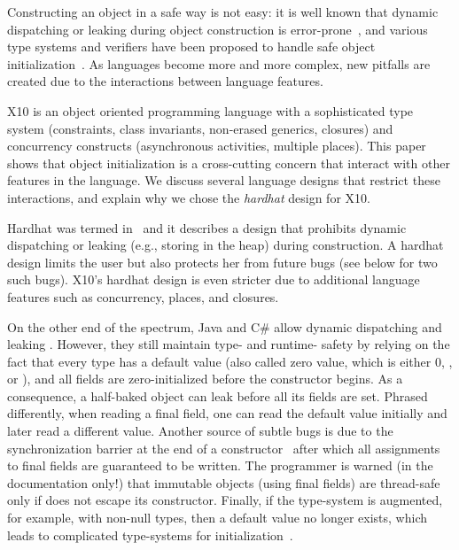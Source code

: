 Constructing an object in a safe way is not easy:
    it is well known that dynamic dispatching
    or leaking \this during object construction
    is error-prone~\cite{Dean:1996,Seo:2007:SBD:1522565.1522587,Gil:2009:WRS:1615184.1615216},
    and various type systems and verifiers have been proposed to
    handle safe object initialization~\cite{Hubert:2010:ESO:1888881.1888890,Zibin:2010:OIG:1869459.1869509,Fahndrich:2007:EOI:1297027.1297052,XinQi:2009}.
As languages become more and more complex,
    new pitfalls are created due to the interactions between
    language features.

X10 is an object oriented programming language with a sophisticated
    type system (constraints, class invariants, non-erased generics, closures)
    and concurrency constructs (asynchronous activities, multiple places).
This paper shows that object initialization is a cross-cutting concern
    that interact with other features in the language.
We discuss several language designs that restrict these interactions,
    and explain why we chose the \emph{hardhat} design for X10.

{Hardhat} was termed in~\cite{Gil:2009:WRS:1615184.1615216}
    and it describes a design that prohibits dynamic dispatching
    or leaking \this (e.g., storing \this in the heap) during construction.
A hardhat design limits the user
    but also protects her from future bugs
    (see  below for two such bugs).
X10's hardhat design is even stricter due to additional language features
    such as concurrency, places, and closures.

On the other end of the spectrum,
    Java and C\# allow
    dynamic dispatching and leaking \this.
However, they still maintain type- and runtime- safety
    by relying on the fact that every type has a default value
    (also called zero value, which is either 0, , or ),
    and all fields are zero-initialized before the constructor begins.
As a consequence,
    a half-baked object can leak before all its fields are set. %
Phrased differently,
    when reading a final field, one can read the default value initially and later read a different value.
Another source of subtle bugs is due to the synchronization barrier
    at the end of a constructor~\cite{JSR133}
    after which all assignments to final fields are guaranteed to be written.
The programmer is warned (in the documentation only!)
    that immutable objects (using final fields) are thread-safe only if
    \this does not escape its constructor.
Finally, if the type-system is augmented, for example, with non-null types, then
    a default value no longer exists,
    which leads to complicated type-systems for initialization~\cite{Fahndrich:2007:EOI:1297027.1297052,XinQi:2009}.

